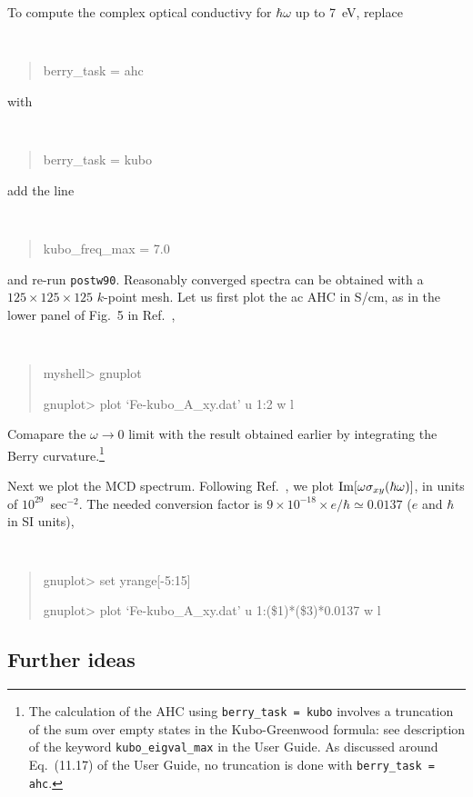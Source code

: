 \documentclass[a4paper,11pt,twoside]{article}
\begin{document}
To compute the complex optical conductivy for $\hbar\omega$
up to 7~eV, replace 
{\tt
\begin{quote}
berry\_task = ahc
\end{quote} }
%
with
%
{\tt
\begin{quote}
berry\_task = kubo
\end{quote} }
%
add the line
%
{\tt
\begin{quote}
kubo\_freq\_max = 7.0
\end{quote} }
%
and re-run {\tt postw90}. Reasonably converged spectra can be
obtained with a $125\times 125\times 125$ $k$-point mesh. Let us first
plot the ac AHC in S/cm, as in the lower panel of Fig.~5 in
Ref.~\cite{yao-prl04}, {\tt
\begin{quote}
myshell> gnuplot

gnuplot> plot `Fe-kubo\_A\_xy.dat' u 1:2 w l
\end{quote} }

Comapare the $\omega\rightarrow 0$ limit with the result obtained
earlier by integrating the Berry curvature.\footnote{The calculation
  of the AHC using {\tt berry\_task = kubo} involves a truncation of
  the sum over empty states in the Kubo-Greenwood formula: see
  description of the keyword {\tt kubo\_eigval\_max} in the User
  Guide. As discussed around Eq.~(11.17) of the User Guide, no
  truncation is done with {\tt berry\_task = ahc}.}


Next we plot the MCD spectrum. Following Ref.~\cite{yao-prl04}, we
plot ${\rm Im}[\omega\sigma_{xy}(\hbar\omega)]$, in units of
$10^{29}$~sec$^{-2}$. The needed conversion factor is $9\times
10^{-18}\times e/\hbar\simeq 0.0137$ ($e$ and $\hbar$ in SI units),
{\tt
\begin{quote}
gnuplot> set yrange[-5:15]

gnuplot> plot `Fe-kubo\_A\_xy.dat' u 1:(\$1)*(\$3)*0.0137 w l
\end{quote} }

\subsection*{Further ideas}
\end{document}
